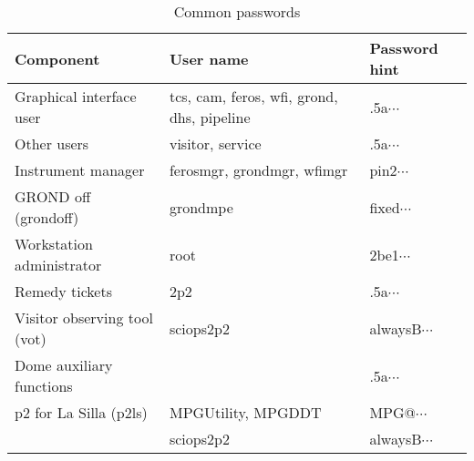 \documentclass[11pt,fleqn,a4paper]{book}
\begin{document}
\begin{table}
\caption{Common passwords}
\label{tab:pwd}
\centering
\begin{tabular}{lll}
\hline
Component                    &  User name                                            & Password hint\\
\hline\hline
Graphical interface user     & tcs, cam, feros, wfi, grond, dhs, pipeline & .5a$\cdots$\\
Other users                  & \gls{visitor}, \gls{service}               & .5a$\cdots$\\
Instrument manager           & ferosmgr, grondmgr, wfimgr                 & pin2$\cdots$\\
GROND off (grondoff)         & grondmpe                                   & fixed$\cdots$\\
Workstation administrator    & root                                       & 2be1$\cdots$\\
Remedy tickets               & 2p2                                        & .5a$\cdots$\\
Visitor observing tool (vot) & sciops2p2                                  & alwaysB$\cdots$\\
Dome auxiliary functions     &                                            & .5a$\cdots$\\
p2 for La Silla (p2ls)       & MPGUtility, MPGDDT                         & MPG@$\cdots$\\
                             & sciops2p2                                  & alwaysB$\cdots$\\
\hline
\end{tabular}
\end{table}


\printglossaries
{}
\end{document}
